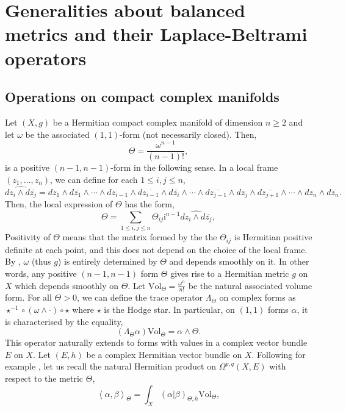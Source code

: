 \documentclass{article}
\theoremstyle{remark}
\theoremstyle{definition}
\newcommand{\Vol}{\mathrm{Vol}}
\renewcommand{\i}{\boldsymbol{\mathrm{i}}}
\newcommand{\scal}[2]{\left< #1,#2 \right>}
\renewcommand{\leq}{\leqslant}
\renewcommand{\geq}{\geqslant}
\begin{document}
\section{Generalities about balanced metrics and their Laplace-Beltrami operators}\label{SEC:Généralités}

\subsection{Operations on compact complex manifolds}

Let $(X,g)$ be a Hermitian compact complex manifold of dimension $n \geq 2$ and let $\omega$ be the associated $(1,1)$-form (not necessarily closed). Then,
$$
\Theta = \frac{\omega^{n - 1}}{(n - 1)!},
$$
is a positive $(n - 1,n - 1)$-form in the following sense. In a local frame $(z_1,\ldots,z_n)$, we can define for each $1 \leq i,j \leq n$,
$$
\widehat{dz_i \wedge d\overline{z_j}} = dz_1 \wedge d\overline{z_1} \wedge \cdots \wedge dz_{i - 1} \wedge d\overline{z_{i - 1}} \wedge d\overline{z_i} \wedge \cdots \wedge d\overline{z_{j - 1}} \wedge dz_j \wedge d\overline{z_{j + 1}} \wedge \cdots \wedge dz_n \wedge d\overline{z_n}.
$$
Then, the local expression of $\Theta$ has the form,
$$
\Theta = \sum_{1 \leq i,j \leq n} \Theta_{ij}\i^{n - 1}\widehat{dz_i \wedge d\overline{z_j}},
$$
Positivity  of $\Theta$ means that the matrix formed by the the $\Theta_{ij}$ is Hermitian positive definite at each point, and this does not depend on the choice of the local frame. By \cite[Equation (4.8)]{Michelsohn}, $\omega$ (thus $g$) is entirely determined by $\Theta$ and depends smoothly on it. In other words, any positive $(n - 1,n - 1)$ form $\Theta$ gives rise to a Hermitian metric $g$ on $X$ which depends smoothly on $\Theta$. Let $\Vol_\Theta = \frac{\omega^n}{n!}$ be the natural associated volume form. For all $\Theta > 0$, we can define the trace operator $\Lambda_\Theta$ on complex forms as $\star^{-1} \circ (\omega \wedge \cdot) \circ \star$ where $\star$ is the Hodge star. In particular, on $(1,1)$ forms $\alpha$, it is characterised by the equality,
$$
(\Lambda_\Theta\alpha)\Vol_\Theta = \alpha \wedge \Theta.
$$
This operator naturally extends to forms with values in a complex vector bundle $E$ on $X$. Let $(E,h)$ be a complex Hermitian vector bundle on $X$. Following for example \cite[Definition 4.1.11]{Huybrechts}, let us recall the natural Hermitian product on $\Omega^{p,q}(X,E)$ with respect to the metric $\Theta$,
\begin{equation}\label{EQ:Produit hermitien}
    \scal{\alpha}{\beta}_\Theta = \int_X (\alpha|\beta)_{\Theta,h}\Vol_\Theta,
\end{equation}
\end{document}
